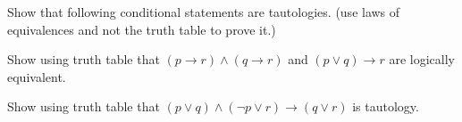 \documentclass{exam}
\begin{document}
\begin{questions}
\question Show that following conditional statements are tautologies. (use laws of equivalences and not the truth table to prove it.)


\question Show using truth table that \((p \rightarrow r) \land (q \rightarrow r)\) and \((p \lor q) \rightarrow r\) are logically equivalent.


\vspace{9in}

\question Show using truth table that \((p \lor q) \land (\neg p \lor r) \rightarrow (q \lor r)\) is tautology. 

\vspace{9in}
\end{questions}
\end{document}
